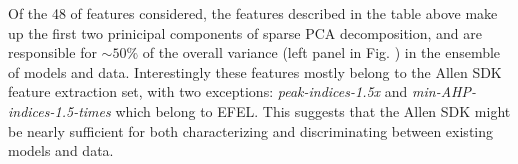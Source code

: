 
  
  



Of the 48 of features considered, the features described in the table above make up the first two prinicipal components of sparse PCA decomposition, and are responsible for $\sim 50\%$ of the overall variance (left panel in Fig. \label{fig:pca_data_points}) in the ensemble of models and data.
Interestingly these features mostly belong to the Allen SDK feature extraction set, with two exceptions: \emph{peak-indices-1.5x}  and \emph{min-AHP-indices-1.5-times} which belong to EFEL.
This suggests that the Allen SDK might be nearly sufficient for both characterizing and discriminating between existing models and data.

